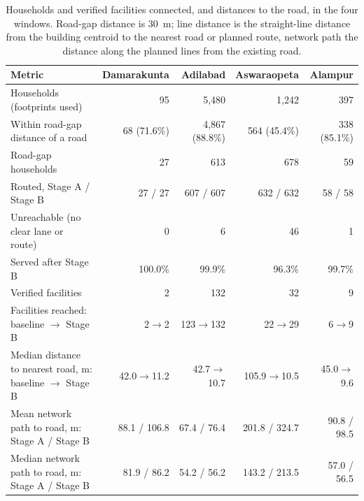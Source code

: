 \documentclass[10pt,a4paper,twocolumn]{article}
\begin{document}
\begin{table}[tbp]
\caption{Households and verified facilities connected, and distances to the road, in the four windows. Road-gap distance is $30$~m; line distance is the straight-line distance from the building centroid to the nearest road or planned route, network path the distance along the planned lines from the existing road.}
\label{tab:access}
\centering
\scriptsize
\begin{tabular}{@{}lrrrr@{}}
\toprule
Metric & Damarakunta & Adilabad & Aswaraopeta & Alampur\\
\midrule
Households (footprints used) & 95 & 5{,}480 & 1{,}242 & 397\\
Within road-gap distance of a road & 68 (71.6\%) & 4{,}867 (88.8\%) & 564 (45.4\%) & 338 (85.1\%)\\
Road-gap households & 27 & 613 & 678 & 59\\
Routed, Stage A / Stage B & 27 / 27 & 607 / 607 & 632 / 632 & 58 / 58\\
Unreachable (no clear lane or route) & 0 & 6 & 46 & 1\\
Served after Stage B & 100.0\% & 99.9\% & 96.3\% & 99.7\%\\
Verified facilities & 2 & 132 & 32 & 9\\
Facilities reached: baseline $\rightarrow$ Stage B & 2$\rightarrow$2 & 123$\rightarrow$132 & 22$\rightarrow$29 & 6$\rightarrow$9\\
Median distance to nearest road, m: baseline $\rightarrow$ Stage B & 42.0$\rightarrow$11.2 & 42.7$\rightarrow$10.7 & 105.9$\rightarrow$10.5 & 45.0$\rightarrow$9.6\\
Mean network path to road, m: Stage A / Stage B & 88.1 / 106.8 & 67.4 / 76.4 & 201.8 / 324.7 & 90.8 / 98.5\\
Median network path to road, m: Stage A / Stage B & 81.9 / 86.2 & 54.2 / 56.2 & 143.2 / 213.5 & 57.0 / 56.5\\
\bottomrule
\end{tabular}
\end{table}
\end{document}
